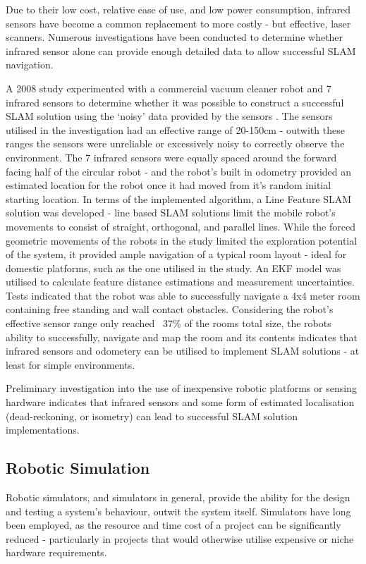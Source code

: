 Due to their low cost, relative ease of use, and low power consumption,
infrared sensors have become a common replacement to more costly - but
effective, laser scanners.
Numerous investigations have been conducted to determine whether infrared
sensor alone can provide enough detailed data to allow successful SLAM
navigation.

A 2008 study experimented with a commercial vacuum cleaner robot and 7 infrared
sensors to determine whether it was possible to construct a successful SLAM
solution using the `noisy' data provided by the sensors \cite{Choi2008}.
The sensors utilised in the investigation had an effective range of 20-150cm -
outwith these ranges the sensors were unreliable or excessively noisy to
correctly observe the environment.
The 7 infrared sensors were equally spaced around the forward facing half of
the circular robot - and the robot's built in odometry provided an estimated
location for the robot once it had moved from it's random initial starting
location.
In terms of the implemented algorithm, a  Line Feature SLAM solution was
developed - line based SLAM solutions limit the mobile robot's movements to
consist of straight, orthogonal, and parallel lines.
While the forced geometric movements of the robots in the study limited the
exploration potential of the system, it provided ample navigation of a typical
room layout - ideal for domestic platforms, such as the one utilised in the
study.
An EKF model was utilised to calculate feature distance estimations and
measurement uncertainties.
Tests indicated that the  robot was able to successfully navigate a 4x4 meter
room containing free standing and wall contact obstacles.
Considering the robot's effective sensor range only reached ~37\% of the rooms
total size, the robots ability to successfully, navigate and map the room and
its contents indicates that infrared sensors and odometery can be utilised to
implement SLAM solutions - at least for simple environments.

Preliminary investigation into the use of inexpensive robotic platforms or
sensing hardware indicates that infrared sensors and some form of estimated
localisation (dead-reckoning, or isometry) can lead to successful SLAM solution
implementations.


\subsection{Robotic Simulation} \label{sec_sim}
Robotic simulators, and simulators in general, provide the ability for the
design and testing a  system's behaviour, outwit the system itself. 
Simulators have long been employed, as the resource and time cost of a project
can be significantly reduced - particularly in projects that would otherwise
utilise expensive or niche hardware requirements.

